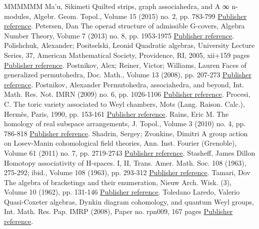 \begin{thebibliography}{MMMMMM}
 Ma’u, Sikimeti Quilted strips, graph associahedra, and A ∞  n-modules, Algebr. Geom. Topol., Volume 15 (2015) no. 2, pp. 783-799 \href{https://alco.centre-mersenne.org/articles/10.5802/alco.347/#MR3342676}{Publisher reference}.
 Petersen, Dan The operad structure of admissible G-covers, Algebra Number Theory, Volume 7 (2013) no. 8, pp. 1953-1975 \href{https://alco.centre-mersenne.org/articles/10.5802/alco.347/#MR3134040}{Publisher reference}.
 Polishchuk, Alexander; Positselski, Leonid Quadratic algebras, University Lecture Series, 37, American Mathematical Society, Providence, RI, 2005, xii+159 pages \href{https://alco.centre-mersenne.org/articles/10.5802/alco.347/#MR2177131}{Publisher reference}.
 Postnikov, Alex; Reiner, Victor; Williams, Lauren Faces of generalized permutohedra, Doc. Math., Volume 13 (2008), pp. 207-273 \href{https://alco.centre-mersenne.org/articles/10.5802/alco.347/#MR2520477}{Publisher reference}.
 Postnikov, Alexander Permutohedra, associahedra, and beyond, Int. Math. Res. Not. IMRN (2009) no. 6, pp. 1026-1106 \href{https://alco.centre-mersenne.org/articles/10.5802/alco.347/#MR2487491}{Publisher reference}.
 Procesi, C. The toric variety associated to Weyl chambers, Mots (Lang. Raison. Calc.), Hermès, Paris, 1990, pp. 153-161 \href{https://alco.centre-mersenne.org/articles/10.5802/alco.347/#MR1252661}{Publisher reference}.
 Rains, Eric M. The homology of real subspace arrangements, J. Topol., Volume 3 (2010) no. 4, pp. 786-818 \href{https://alco.centre-mersenne.org/articles/10.5802/alco.347/#MR2746338}{Publisher reference}.
 Shadrin, Sergey; Zvonkine, Dimitri A group action on Losev-Manin cohomological field theories, Ann. Inst. Fourier (Grenoble), Volume 61 (2011) no. 7, pp. 2719-2743 \href{https://alco.centre-mersenne.org/articles/10.5802/alco.347/#MR3112505}{Publisher reference}.
 Stasheff, James Dillon Homotopy associativity of H-spaces. I, II, Trans. Amer. Math. Soc. 108 (1963), 275-292; ibid., Volume 108 (1963), pp. 293-312 \href{https://alco.centre-mersenne.org/articles/10.5802/alco.347/#MR0158400}{Publisher reference}.
 Tamari, Dov The algebra of bracketings and their enumeration, Nieuw Arch. Wisk. (3), Volume 10 (1962), pp. 131-146 \href{https://alco.centre-mersenne.org/articles/10.5802/alco.347/#MR146227}{Publisher reference}.
 Toledano Laredo, Valerio Quasi-Coxeter algebras, Dynkin diagram cohomology, and quantum Weyl groups, Int. Math. Res. Pap. IMRP (2008), Paper no. rpn009, 167 pages \href{https://alco.centre-mersenne.org/articles/10.5802/alco.347/#MR2470574}{Publisher reference}.

\end{thebibliography}
